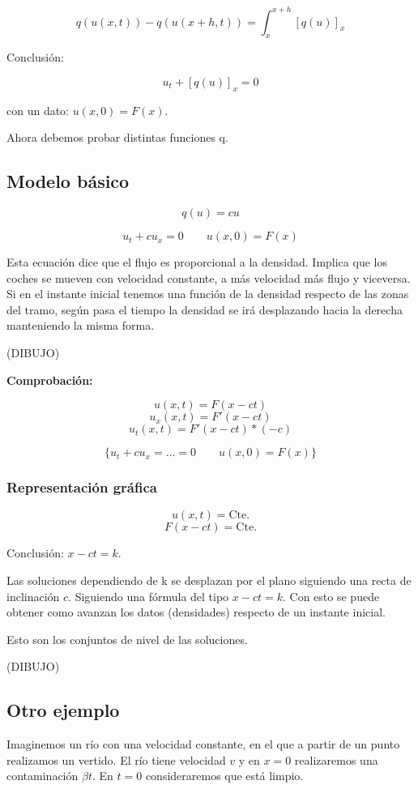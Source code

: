 \documentclass[palatino]{apuntes}
\begin{document}
$$ q(u(x,t)) - q(u(x+h,t)) = \int^{x+h}_{x} [q(u)]_{x} $$

Conclusión:

$$ u_t + [q(u)]_{x} = 0$$

con un dato: $u(x, 0) = F(x)$.

Ahora debemos probar distintas funciones q.


\subsection{Modelo básico}

$$q(u) = cu$$

$$u_t + cu_x = 0 \quad\quad u(x,0) = F(x)$$


Esta ecuación dice que el flujo es proporcional a la densidad. Implica que los coches se mueven con velocidad constante, a más velocidad más flujo y viceversa. Si en el instante inicial tenemos una función de la densidad respecto de las zonas del tramo, según pasa el tiempo la densidad se irá desplazando hacia la derecha manteniendo la misma forma.

(DIBUJO)

\textbf{Comprobación:}

$$ u(x,t) = F(x-ct) $$
$$ u_x(x,t) = F'(x-ct)$$
$$u_t(x,t) = F'(x-ct)*(-c)$$

$$ \{ u_t + cu_x = … = 0 \quad\quad u(x,0) = F(x) \} $$

\subsubsection{Representación gráfica}


$$u(x,t) = \text{Cte.}$$
$$F(x - ct) = \text{Cte.}$$

Conclusión: $x-ct = k$.


Las soluciones dependiendo de k se desplazan por el plano siguiendo una recta de inclinación $c$. Siguiendo una fórmula del tipo $x-ct = k$. Con esto se puede obtener como avanzan los datos (densidades) respecto de un instante inicial.

Esto son los conjuntos de nivel de las soluciones.

(DIBUJO)



\subsection{Otro ejemplo}

Imaginemos un río con una velocidad constante, en el que a partir de un punto realizamos un vertido. El río tiene velocidad $v$ y en $x=0$ realizaremos una contaminación $\beta{t}$. En $t=0$ consideraremos que está limpio.
\end{document}
